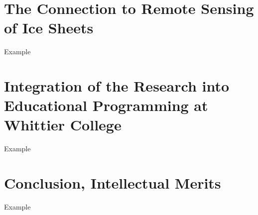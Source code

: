 \documentclass[../../main.tex]{subfiles}
\begin{document}
\section{The Connection to Remote Sensing of Ice Sheets}
\label{sec:cresis}

Example

\section{Integration of the Research into Educational Programming at Whittier College}
\label{sec:int}

Example

\section{Conclusion, Intellectual Merits}
\label{sec:conc_im}

Example
\end{document}
